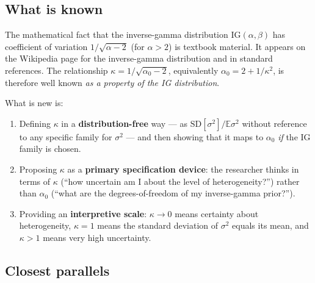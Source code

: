 \documentclass[12pt,a4paper]{article}
\newcommand{\E}{\mathbb{E}}
\newcommand{\SD}{\mathrm{SD}}
\newcommand{\IG}{\mathrm{IG}}
\begin{document}
\subsection{What is known}

The mathematical fact that the inverse-gamma distribution $\IG(\alpha, \beta)$
has coefficient of variation $1/\sqrt{\alpha - 2}$ (for $\alpha > 2$) is
textbook material. It appears on the Wikipedia page for the inverse-gamma
distribution and in standard references. The relationship
$\kappa = 1/\sqrt{\alpha_0 - 2}$, equivalently $\alpha_0 = 2 + 1/\kappa^2$,
is therefore well known \emph{as a property of the IG distribution}.

What is new is:
\begin{enumerate}[label=(\roman*)]
  \item Defining $\kappa$ in a \textbf{distribution-free} way --- as
    $\SD[\sigma^2]/\E{\sigma^2}$ without reference to any specific family for
    $\sigma^2$ --- and then showing that it maps to $\alpha_0$ \emph{if} the IG
    family is chosen.
  \item Proposing $\kappa$ as a \textbf{primary specification device}: the
    researcher thinks in terms of $\kappa$ (``how uncertain am I about the
    level of heterogeneity?'') rather than $\alpha_0$ (``what are the
    degrees-of-freedom of my inverse-gamma prior?'').
  \item Providing an \textbf{interpretive scale}: $\kappa \to 0$ means
    certainty about heterogeneity, $\kappa = 1$ means the standard deviation of
    $\sigma^2$ equals its mean, and $\kappa > 1$ means very high uncertainty.
\end{enumerate}

\subsection{Closest parallels}
\end{document}
